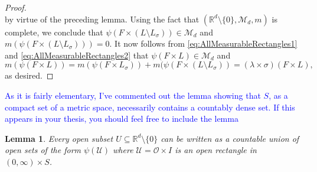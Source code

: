 \documentclass[11pt]{article}
\theoremstyle{theorem}
\newtheorem{lemma}[theorem]{Lemma}
\begin{document}
\begin{proof}
\begin{equation*}
\end{equation*}
by virtue of the preceding lemma. Using the fact that $(\mathbb{R}^d\setminus\{0\},\mathcal{M}_d,m)$ is complete, we conclude that $\psi(F\times (L\setminus L_\sigma))\in \mathcal{M}_d$ and $m(\psi(F\times (L\setminus L_\sigma)))=0$. It now follows from \eqref{eq:AllMeasurableRectangles1} and \eqref{eq:AllMeasurableRectangles2} that $\psi(F\times L)\in\mathcal{M}_d$ and
\begin{equation*}
m(\psi(F\times L))=m(\psi(F\times L_\sigma))+m(\psi(F\times (L\setminus L_\sigma))=(\lambda\times\sigma)(F\times L),
\end{equation*}
as desired.
\end{proof}

\noindent \textcolor{blue}{As it is fairly elementary, I've commented out the lemma showing that $S$, as a compact set of a metric space, necessarily contains a countably dense set. If this appears in your thesis, you should feel free to include the lemma}


\begin{lemma}\label{lem:OpenRectangle}
Every open subset $U\subseteq \mathbb{R}^d\setminus\{0\}$ can be written as a countable union of open sets of the form $\psi(\mathcal{U})$ where $\mathcal{U}=\mathcal{O}\times I$ is an open rectangle in $(0,\infty)\times S$.
\end{lemma}
\end{document}
